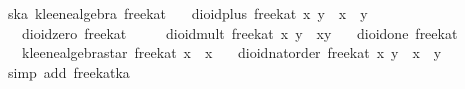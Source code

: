 \begin{isabellebody}
\isamarkupfalse%
%
\endisatagproof
{\isafoldproof}%
%
\isadelimproof
\isanewline
%
\endisadelimproof
\isanewline
\isanewline
\isanewline
{}\isamarkupfalse%
\ ska{}\ kleene{}algebra\ free{}kat\isanewline
\ \ \ {}dioid{}plus\ free{}kat\ x\ y\ {}\ x\ {}\ y{}\isanewline
\ \ \ {}dioid{}zero\ free{}kat\ {}\ {}{}\isanewline
\ \ \ {}dioid{}mult\ free{}kat\ x\ y\ {}\ x{}y{}\isanewline
\ \ \ {}dioid{}one\ free{}kat\ {}\ {}{}\isanewline
\ \ \ {}kleene{}algebra{}star\ free{}kat\ x\ {}\ x\isanewline
\ \ \ {}dioid{}nat{}order\ free{}kat\ x\ y\ {}\ {}x\ {}\ y{}{}\isanewline
%
\isadelimproof
\ \ %
\endisadelimproof
%
\isatagproof
{}\isamarkupfalse%
\ {}simp\ add{}\ free{}kat{}ka{}\isanewline
\ \ \isamarkupfalse%

\end{isabellebody}
